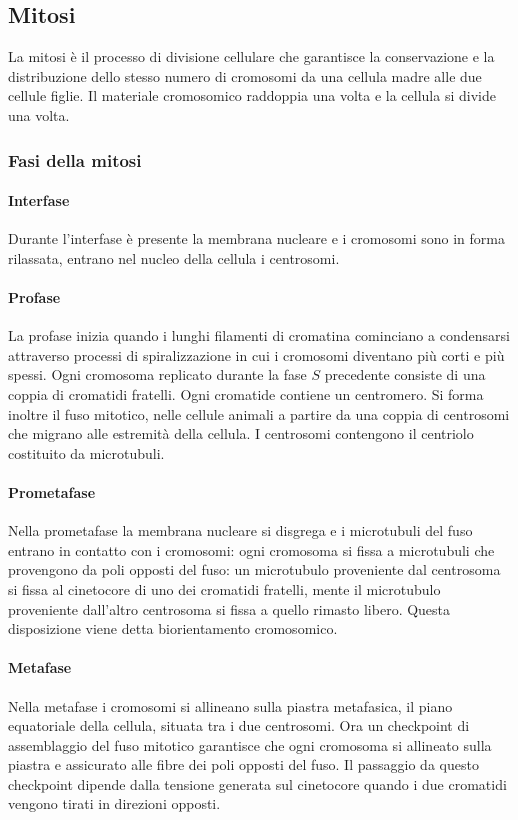 \subsection{Mitosi}
La mitosi \`e il processo di divisione cellulare che garantisce la conservazione e la distribuzione dello stesso numero di cromosomi da una cellula madre alle due cellule figlie. Il
materiale cromosomico raddoppia una volta e la cellula si divide una volta. 
\subsubsection{Fasi della mitosi}
\paragraph{Interfase}
Durante l'interfase \`e presente la membrana nucleare e i cromosomi sono in forma rilassata, entrano nel nucleo della cellula i centrosomi. 
\paragraph{Profase}
La profase inizia quando i lunghi filamenti di cromatina cominciano a condensarsi attraverso processi di spiralizzazione in cui i cromosomi diventano pi\`u corti e pi\`u spessi. Ogni
cromosoma replicato durante la fase $S$ precedente consiste di una coppia di cromatidi fratelli. Ogni cromatide contiene un centromero. Si forma inoltre il fuso mitotico, nelle cellule animali a partire
da una coppia di centrosomi che migrano alle estremit\`a della cellula. I centrosomi contengono il centriolo costituito da microtubuli.
\paragraph{Prometafase}
Nella prometafase la membrana nucleare si disgrega e i microtubuli del fuso entrano in contatto con i cromosomi: ogni cromosoma si fissa a microtubuli che provengono da poli opposti del fuso: un 
microtubulo proveniente dal centrosoma si fissa al cinetocore di uno dei cromatidi fratelli, mente il microtubulo proveniente dall'altro centrosoma si fissa a quello rimasto libero. Questa disposizione
viene detta  biorientamento cromosomico.
\paragraph{Metafase}
Nella metafase i cromosomi si allineano sulla piastra metafasica, il piano equatoriale della cellula, situata tra i due centrosomi. Ora un checkpoint di assemblaggio del fuso mitotico garantisce che
ogni cromosoma si allineato sulla piastra e assicurato alle fibre dei poli opposti del fuso. Il passaggio da questo checkpoint dipende dalla tensione generata sul cinetocore quando i due cromatidi vengono
tirati in direzioni opposti.
